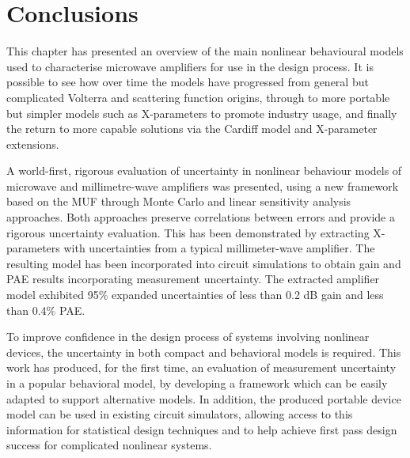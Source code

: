 \documentclass[../thesis/thesis.tex]{subfiles}
\begin{document}
\section{Conclusions}

This chapter has presented an overview of the main nonlinear behavioural models used to characterise microwave amplifiers for use in the design process. It is possible to see how over time the models have progressed from general but complicated Volterra and scattering function origins, through to more portable but simpler models such as X-parameters to promote industry usage, and finally the return to more capable solutions via the Cardiff model and X-parameter extensions.

A world-first, rigorous evaluation of uncertainty in nonlinear behaviour models of microwave and millimetre-wave amplifiers was presented, using a new framework based on the MUF through Monte Carlo and linear sensitivity analysis approaches. Both approaches preserve correlations between errors and provide a rigorous uncertainty evaluation. This has been demonstrated by extracting X-parameters with uncertainties from a typical millimeter-wave amplifier. The resulting model has been incorporated into circuit simulations to obtain gain and PAE results incorporating measurement uncertainty. The extracted amplifier model exhibited 95\% expanded uncertainties of less than 0.2 dB gain and less than 0.4\% PAE. 

To improve confidence in the design process of systems involving nonlinear devices, the uncertainty in both compact and behavioral models is required. This work has produced, for the first time, an evaluation of measurement uncertainty in a popular behavioral model, by developing a framework which can be easily adapted to support alternative models. In addition, the produced portable device model can be used in existing circuit simulators, allowing access to this information for statistical design techniques and to help achieve first pass design success for complicated nonlinear systems.

\end{document}
